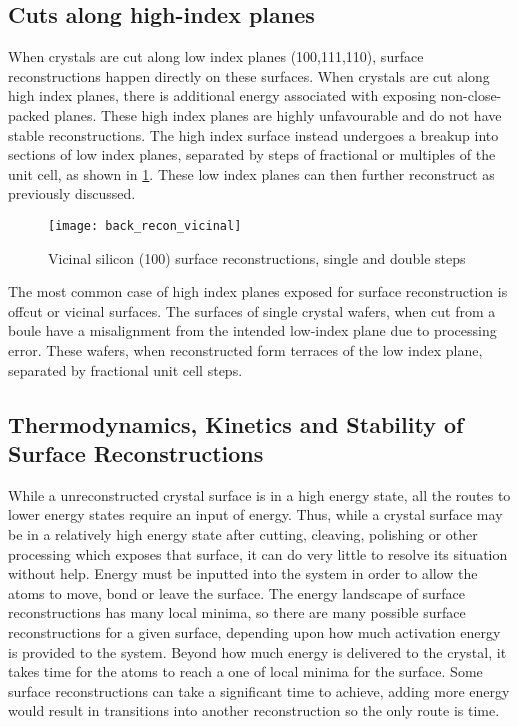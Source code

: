 \subsection{Cuts along high-index planes}
When crystals are cut along low index planes (100,111,110), surface reconstructions happen directly on these surfaces. When crystals are cut along high index planes, there is additional energy associated with exposing non-close-packed planes. These high index planes are highly unfavourable and do not have stable reconstructions. The high index surface instead undergoes a breakup into sections of low index planes, separated by steps of fractional or multiples of the unit cell, as shown in \cref{fig:back_recon_vicinal}. These low index planes can then further reconstruct as previously discussed.
\begin{figure}
    \centering
    \texttt{[image: back\_recon\_vicinal]}
    \caption{\label{fig:back_recon_vicinal}Vicinal silicon (100) surface reconstructions, single and double steps\cite{Alerhand1990}}
\end{figure}

The most common case of high index planes exposed for surface reconstruction is offcut or vicinal surfaces. The surfaces of single crystal wafers, when cut from a boule have a misalignment from the intended low-index plane due to processing error. These wafers, when reconstructed form terraces of the low index plane, separated by fractional unit cell steps.

\subsection{Thermodynamics, Kinetics and Stability of Surface Reconstructions}
While a unreconstructed crystal surface is in a high energy state, all the routes to lower energy states require an input of energy. Thus, while a crystal surface may be in a relatively high energy state after cutting, cleaving, polishing or other processing which exposes that surface, it can do very little to resolve its situation without help. Energy must be inputted into the system in order to allow the atoms to move, bond or leave the surface. The energy landscape of surface reconstructions has many local minima, so there are many possible surface reconstructions for a given surface, depending upon how much activation energy is provided to the system. Beyond how much energy is delivered to the crystal, it takes time for the atoms to reach a one of local minima for the surface. Some surface reconstructions can take a significant time to achieve, adding more energy would result in transitions into another reconstruction so the only route is time.

